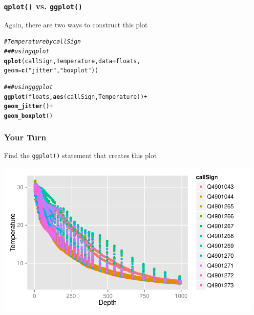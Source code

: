 \documentclass{beamer}\usepackage[]{graphicx}\usepackage[]{color}
\makeatletter
\newcommand{\hlstr}[1]{\textcolor[rgb]{0.192,0.494,0.8}{#1}}%
\newcommand{\hlcom}[1]{\textcolor[rgb]{0.678,0.584,0.686}{\textit{#1}}}%
\newcommand{\hlopt}[1]{\textcolor[rgb]{0,0,0}{#1}}%
\newcommand{\hlstd}[1]{\textcolor[rgb]{0.345,0.345,0.345}{#1}}%
\newcommand{\hlkwc}[1]{\textcolor[rgb]{0.333,0.667,0.333}{#1}}%
\newcommand{\hlkwd}[1]{\textcolor[rgb]{0.737,0.353,0.396}{\textbf{#1}}}%
\newenvironment{kframe}{%
 \def\at@end@of@kframe{}%
 \ifinner\ifhmode%
  \def\at@end@of@kframe{\end{minipage}}%
  \begin{minipage}{\columnwidth}%
 \fi\fi%
 \def\FrameCommand##1{\hskip\@totalleftmargin \hskip-\fboxsep
 \colorbox{shadecolor}{##1}\hskip-\fboxsep
     \hskip-\linewidth \hskip-\@totalleftmargin \hskip\columnwidth}%
 \MakeFramed {\advance\hsize-\width
   \@totalleftmargin\z@ \linewidth\hsize
   \@setminipage}}%
 {\par\unskip\endMakeFramed%
 \at@end@of@kframe}
\newenvironment{knitrout}{}{} %
\makeatother
\begin{document}
\begin{frame}[fragile]
\frametitle{\texttt{qplot()} vs. \texttt{ggplot()}}
Again, there are two ways to construct this plot 
\begin{knitrout}\footnotesize
{}\color{fgcolor}\begin{kframe}
\begin{alltt}
\hlcom{# Temperature by callSign}
\hlcom{### using qplot}
\hlkwd{qplot}\hlstd{(callSign, Temperature,} \hlkwc{data}\hlstd{=floats,}
      \hlkwc{geom}\hlstd{=}\hlkwd{c}\hlstd{(}\hlstr{"jitter"}\hlstd{,} \hlstr{"boxplot"}\hlstd{))}

\hlcom{### using ggplot}
\hlkwd{ggplot}\hlstd{(floats,} \hlkwd{aes}\hlstd{(callSign, Temperature))} \hlopt{+}
  \hlkwd{geom_jitter}\hlstd{()} \hlopt{+}
  \hlkwd{geom_boxplot}\hlstd{()}
\end{alltt}
\end{kframe}
\end{knitrout}
\end{frame}


\begin{frame}[fragile]
\frametitle{Your Turn}
Find the \texttt{ggplot()} statement that creates this plot
\begin{knitrout}\footnotesize
{}\color{fgcolor}

{\centering \includegraphics[width=.9\linewidth]{figure/ggyourturn} 

}



\end{knitrout}
\end{frame}

\end{document}
